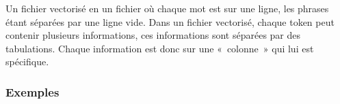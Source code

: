 \documentclass[manual-fr.tex]{subfiles}
\begin{document}
Un fichier vectorisé en un fichier où chaque mot est sur une ligne, les phrases étant séparées par une ligne vide. Dans un fichier vectorisé,
chaque token peut contenir plusieurs informations, ces informations sont séparées par des tabulations. Chaque information est donc sur une
«\ colonne\ » qui lui est spécifique.

\subsubsection{Exemples}

\end{document}
